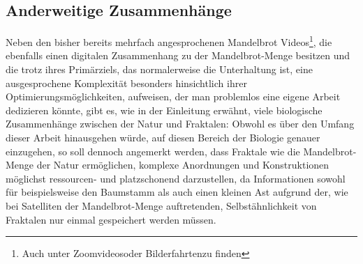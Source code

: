 \subsection{Anderweitige Zusammenhänge}\label{subsec:other-connections}

Neben den bisher bereits mehrfach angesprochenen
\glqq Mandelbrot Videos\grqq\footnote{
  Auch unter \glqq Zoomvideos\grqq oder \glqq Bilderfahrten\grqq zu finden
}, die ebenfalls einen digitalen Zusammenhang zu der Mandelbrot-Menge besitzen
und die trotz ihres Primärziels, das normalerweise die Unterhaltung ist, eine
ausgesprochene Komplexität besonders hinsichtlich ihrer Optimierungsmöglichkeiten,
aufweisen, der man problemlos eine eigene Arbeit dedizieren könnte,
gibt es, wie in der Einleitung erwähnt,
viele biologische Zusammenhänge zwischen der Natur und Fraktalen:
Obwohl es über den Umfang dieser Arbeit hinausgehen würde, auf diesen Bereich
der Biologie genauer einzugehen, so soll dennoch angemerkt werden,
dass Fraktale wie die Mandelbrot-Menge der Natur ermöglichen,
komplexe Anordnungen und Konstruktionen möglichst ressourcen- und platzschonend
darzustellen, da Informationen sowohl für beispielsweise den Baumstamm als auch
einen kleinen Ast aufgrund der, wie bei Satelliten der Mandelbrot-Menge auftretenden,
Selbstähnlichkeit von Fraktalen nur einmal gespeichert werden müssen.